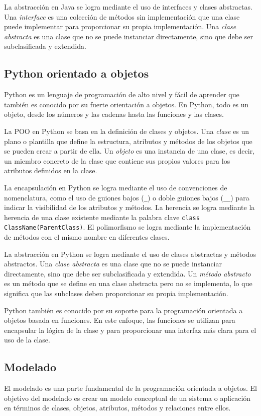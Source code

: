 \documentclass[executivepaper]{article}
\begin{document}
La abstracción en Java se logra mediante el uso de interfaces y clases abstractas. Una \textit{interface} es una colección de métodos sin implementación que una clase puede implementar para proporcionar su propia implementación. Una \textit{clase abstracta} es una clase que no se puede instanciar directamente, sino que debe ser subclasificada y extendida.

\subsection*{Python orientado a objetos}
Python es un lenguaje de programación de alto nivel y fácil de aprender que también es conocido por su fuerte orientación a objetos. En Python, todo es un objeto, desde los números y las cadenas hasta las funciones y las clases.

La POO en Python se basa en la definición de clases y objetos. Una \textit{clase} es un plano o plantilla que define la estructura, atributos y métodos de los objetos que se pueden crear a partir de ella. Un \textit{objeto} es una instancia de una clase, es decir, un miembro concreto de la clase que contiene sus propios valores para los atributos definidos en la clase.

La encapsulación en Python se logra mediante el uso de convenciones de nomenclatura, como el uso de guiones bajos (\lstinline{_}) o doble guiones bajos (\lstinline{__}) para indicar la visibilidad de los atributos y métodos. La herencia se logra mediante la herencia de una clase existente mediante la palabra clave \lstinline{class ClassName(ParentClass)}. El polimorfismo se logra mediante la implementación de métodos con el mismo nombre en diferentes clases.

La abstracción en Python se logra mediante el uso de clases abstractas y métodos abstractos. Una \textit{clase abstracta} es una clase que no se puede instanciar directamente, sino que debe ser subclasificada y extendida. Un \textit{método abstracto} es un método que se define en una clase abstracta pero no se implementa, lo que significa que las subclases deben proporcionar su propia implementación.

Python también es conocido por su soporte para la programación orientada a objetos basada en funciones. En este enfoque, las funciones se utilizan para encapsular la lógica de la clase y para proporcionar una interfaz más clara para el uso de la clase.

\subsection{Modelado}
El modelado es una parte fundamental de la programación orientada a objetos. El objetivo del modelado es crear un modelo conceptual de un sistema o aplicación en términos de clases, objetos, atributos, métodos y relaciones entre ellos.
\end{document}
